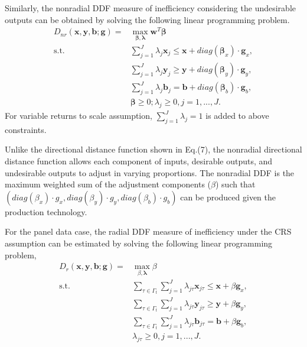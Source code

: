 Similarly, the nonradial DDF measure of inefficiency considering the undesirable outputs can be obtained by solving the following linear programming problem.
\begin{equation}\begin{split}\label{eq_eff_nr}
    D_{nr} (\pmb{x},\pmb{y},\pmb{b};\pmb{g}) 
    = &\max _{\pmb{\beta},\pmb{\lambda}} \pmb{w}^{T} \pmb{\beta}  \\ 
    \text{s.t.} &\sum\limits_{j = 1}^J {\lambda _j \pmb{x}_j \le \pmb{x} + diag(\pmb{\beta}_x)\cdot \pmb{g}_x}, \\ 
                &\sum\limits_{j = 1}^J {\lambda _j \pmb{y}_j \ge \pmb{y} + diag(\pmb{\beta}_y)\cdot \pmb{g}_y}, \\ 
                &\sum\limits_{j = 1}^J {\lambda _j \pmb{b}_j = \pmb{b} + diag(\pmb{\beta}_b)\cdot \pmb{g}_b}, \\ 
                &\pmb{\beta} \ge 0; \lambda _j \ge 0, j = 1,...,J.
\end{split}\end{equation}
For variable returns to scale assumption, $\sum_{j=1}^{J} \lambda_j =1$ is added to above constraints. 

Unlike the directional distance function shown in Eq.(7), the nonradial directional distance function allows each component of inputs, desirable outputs, and undesirable outputs to adjust in varying proportions. The nonradial DDF is the maximum weighted sum of the adjustment components ($\beta$) such that $(diag(\beta_x)\cdot g_x,diag(\beta_y)\cdot g_y,diag(\beta_b)\cdot g_b)$ can be produced given the production technology. 


For the panel data case, the radial DDF measure of inefficiency under the CRS assumption can be estimated by solving the following linear programming problem,
\begin{equation}\begin{split}\label{eq_eff_r_panel}
    D_r (\pmb{x},\pmb{y},\pmb{b};\pmb{g}) 
    = &\max _{\beta,\pmb{\lambda}} \beta  \\ 
    \text{s.t.} &\sum\limits_{\tau \in \Gamma_t }\sum\limits_{j = 1}^J {{\lambda _{j\tau}}{{\pmb{x}}_{j\tau}} \le \pmb{x} + \beta \pmb{g}_x}, \\ 
                &\sum\limits_{\tau \in \Gamma_t }\sum\limits_{j = 1}^J {{\lambda _{j\tau}}{{\pmb{y}}_{j\tau}} \ge \pmb{y} + \beta \pmb{g}_y}, \\ 
                &\sum\limits_{\tau \in \Gamma_t }\sum\limits_{j = 1}^J {{\lambda _{j\tau}}{{\pmb{b}}_{j\tau}} = \pmb{b} + \beta \pmb{g}_b}, \\ 
                &\lambda _{j\tau} \ge 0, j = 1,...,J.
\end{split}\end{equation}

